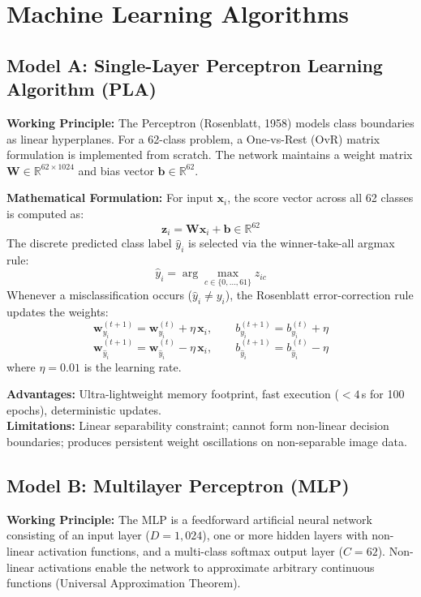 \documentclass[12pt,a4paper]{article}
\begin{document}
\section{Machine Learning Algorithms}

\subsection{Model A: Single-Layer Perceptron Learning Algorithm (PLA)}
\textbf{Working Principle:} The Perceptron (Rosenblatt, 1958) models class boundaries as linear hyperplanes. For a 62-class problem, a One-vs-Rest (OvR) matrix formulation is implemented from scratch. The network maintains a weight matrix $\mathbf{W} \in \mathbb{R}^{62 \times 1024}$ and bias vector $\mathbf{b} \in \mathbb{R}^{62}$.

\textbf{Mathematical Formulation:}
For input $\mathbf{x}_i$, the score vector across all 62 classes is computed as:
\begin{equation}
\mathbf{z}_i = \mathbf{W} \mathbf{x}_i + \mathbf{b} \in \mathbb{R}^{62}
\end{equation}
The discrete predicted class label $\hat{y}_i$ is selected via the winner-take-all argmax rule:
\begin{equation}
\hat{y}_i = \arg\max_{c \in \{0, \dots, 61\}} z_{ic}
\end{equation}
Whenever a misclassification occurs ($\hat{y}_i \ne y_i$), the Rosenblatt error-correction rule updates the weights:
\begin{equation}
\mathbf{w}_{y_i}^{(t+1)} = \mathbf{w}_{y_i}^{(t)} + \eta \, \mathbf{x}_i, \qquad b_{y_i}^{(t+1)} = b_{y_i}^{(t)} + \eta
\end{equation}
\begin{equation}
\mathbf{w}_{\hat{y}_i}^{(t+1)} = \mathbf{w}_{\hat{y}_i}^{(t)} - \eta \, \mathbf{x}_i, \qquad b_{\hat{y}_i}^{(t+1)} = b_{\hat{y}_i}^{(t)} - \eta
\end{equation}
where $\eta = 0.01$ is the learning rate.

\textbf{Advantages:} Ultra-lightweight memory footprint, fast execution ($<4$\,s for 100 epochs), deterministic updates. \\
\textbf{Limitations:} Linear separability constraint; cannot form non-linear decision boundaries; produces persistent weight oscillations on non-separable image data.

\subsection{Model B: Multilayer Perceptron (MLP)}
\textbf{Working Principle:} The MLP is a feedforward artificial neural network consisting of an input layer ($D = 1,024$), one or more hidden layers with non-linear activation functions, and a multi-class softmax output layer ($C = 62$). Non-linear activations enable the network to approximate arbitrary continuous functions (Universal Approximation Theorem).
\end{document}
